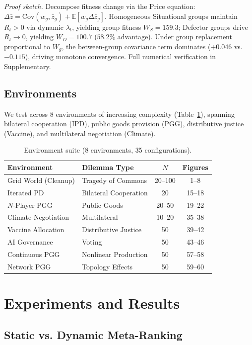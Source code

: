 \documentclass{article}
\begin{document}
\noindent \textit{Proof sketch.} Decompose fitness change via the Price equation: $\Delta\bar{z} = \text{Cov}(w_g, \bar{z}_g) + \mathbb{E}[w_g \Delta\bar{z}_g]$. Homogeneous Situational groups maintain $R_t > 0$ via dynamic $\lambda_t$, yielding group fitness $W_S = 159.3$; Defector groups drive $R_t \to 0$, yielding $W_D = 100.7$ ($58.2\%$ advantage). Under group replacement proportional to $W_g$, the between-group covariance term dominates ($+0.046$ vs.\ $-0.115$), driving monotone convergence. Full numerical verification in Supplementary.

\subsection{Environments}

We test across 8 environments of increasing complexity (Table~\ref{tab:envs}), spanning bilateral cooperation (IPD), public goods provision (PGG), distributive justice (Vaccine), and multilateral negotiation (Climate).

\begin{table}[h]
\centering
\caption{Environment suite (8 environments, 35 configurations).}
\label{tab:envs}
\begin{tabular}{llcc}
\toprule
Environment & Dilemma Type & $N$ & Figures \\
\midrule
Grid World (Cleanup) & Tragedy of Commons & 20--100 & 1--8 \\
Iterated PD & Bilateral Cooperation & 20 & 15--18 \\
$N$-Player PGG & Public Goods & 20--50 & 19--22 \\
Climate Negotiation & Multilateral & 10--20 & 35--38 \\
Vaccine Allocation & Distributive Justice & 50 & 39--42 \\
AI Governance & Voting & 50 & 43--46 \\
Continuous PGG & Nonlinear Production & 50 & 57--58 \\
Network PGG & Topology Effects & 50 & 59--60 \\
\bottomrule
\end{tabular}
\end{table}

\section{Experiments and Results}

\subsection{Static vs. Dynamic Meta-Ranking}
\end{document}
